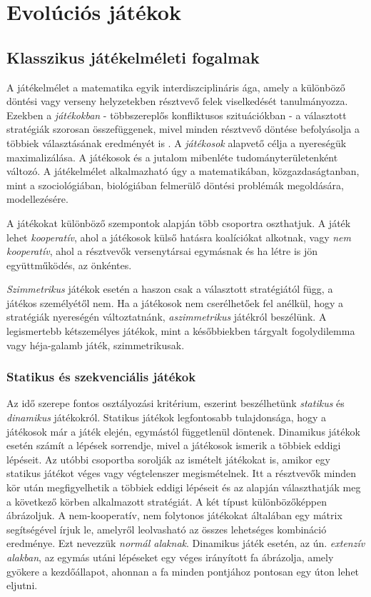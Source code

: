 \chapter{Evolúciós játékok}

\section{Klasszikus játékelméleti fogalmak}
A játékelmélet a matematika egyik interdiszciplináris ága, amely a különböző döntési vagy verseny helyzetekben résztvevő felek viselkedését tanulmányozza. Ezekben a \textit{játékokban} - többszereplős konfliktusos szituációkban - a választott stratégiák szorosan összefüggenek, mivel minden résztvevő döntése befolyásolja a többiek választásának eredményét is \cite{wiki:gametheory}. A \textit{játékosok} alapvető célja a nyereségük maximalizálása. A játékosok és a jutalom mibenléte tudományterületenként változó. A játékelmélet alkalmazható úgy a matematikában, közgazdaságtanban, mint a  szociológiában, biológiában felmerülő döntési problémák megoldására, modellezésére.

A játékokat különböző szempontok alapján több csoportra oszthatjuk. A játék lehet \textit{kooperatív}, ahol a játékosok külső hatásra koalíciókat alkotnak, vagy \textit{nem kooperatív}, ahol a résztvevők versenytársai egymásnak és ha létre is jön együttműködés, az önkéntes. 

\textit{Szimmetrikus} játékok esetén a haszon csak a választott stratégiától függ, a játékos személyétől nem. Ha a játékosok nem cserélhetőek fel anélkül, hogy a stratégiák nyereségén változtatnánk, \textit{aszimmetrikus} játékról beszélünk. A legismertebb kétszemélyes játékok, mint a későbbiekben tárgyalt fogolydilemma vagy héja-galamb játék, szimmetrikusak.

\subsection{Statikus és szekvenciális játékok}
Az idő szerepe fontos osztályozási kritérium, eszerint beszélhetünk \textit{statikus} és \textit{dinamikus} játékokról. Statikus játékok legfontosabb tulajdonsága, hogy a játékosok már a játék elején, egymástól függetlenül döntenek. Dinamikus játékok esetén számít a lépések sorrendje, mivel a játékosok ismerik a többiek eddigi lépéseit. Az utóbbi csoportba sorolják az ismételt játékokat is, amikor egy statikus játékot véges vagy végtelenszer megismételnek. Itt a résztvevők minden kör után megfigyelhetik a többiek eddigi lépéseit és az alapján választhatják meg a következő körben alkalmazott stratégiát. A két típust különbözőképpen ábrázoljuk. A nem-kooperatív, nem folytonos játékokat általában egy mátrix segítségével írjuk le, amelyről leolvasható az összes lehetséges kombináció eredménye. Ezt nevezzük \textit{normál alaknak}. Dinamikus játék esetén, az ún. \textit{extenzív alakban}, az egymás utáni lépéseket egy véges irányított fa ábrázolja, amely gyökere a kezdőállapot, ahonnan a fa minden pontjához pontosan egy úton lehet eljutni.


